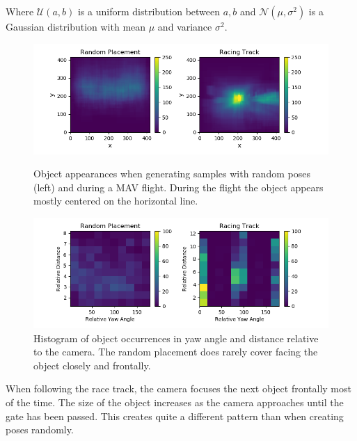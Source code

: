 Where $ \mathcal{U}(a,b)$ is a uniform distribution between $a,b$ and $\mathcal{N}(\mu,\sigma^2)$ is a Gaussian distribution with mean $\mu$ and variance $\sigma^2$.

\begin{figure}
	\begin{minipage}{\textwidth}
		\includegraphics[width=\textwidth]{fig/heatmap_camplace}
		\caption{Object appearances when generating samples with random poses (left) and during a \ac{MAV} flight. During the flight the object appears mostly centered on the horizontal line.}
		\label{fig:heatmap_camplace}
	\end{minipage}
	\begin{minipage}{\textwidth}
		\includegraphics[width=\textwidth]{fig/hist2d_camplace}
		\caption{Histogram of object occurrences in yaw angle and distance relative to the camera. The random placement does rarely cover facing the object closely and frontally. }
		\label{fig:hist2d_camplace}
	\end{minipage}
\end{figure}

When following the race track, the camera focuses the next object frontally most of the time. The size of the object increases as the camera approaches until the gate has been passed. This creates quite a different pattern than when creating poses randomly.

